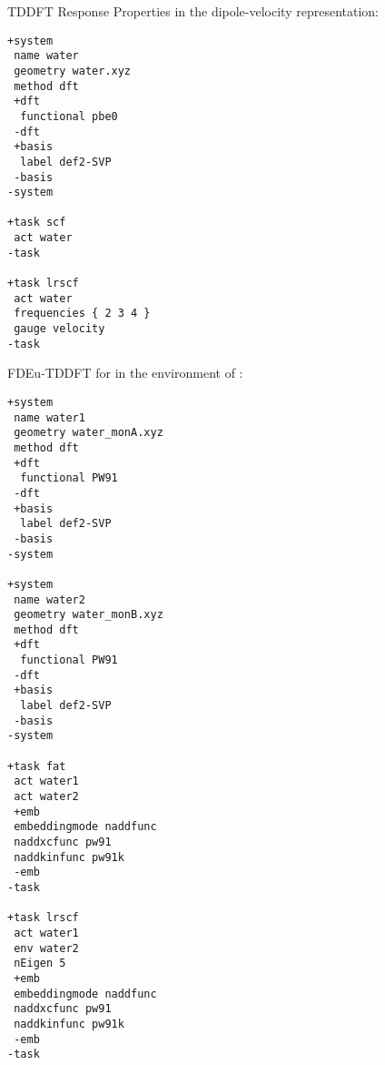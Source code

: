 TDDFT Response Properties in the dipole-velocity representation:
\begin{lstlisting}
+system
 name water
 geometry water.xyz
 method dft
 +dft
  functional pbe0
 -dft
 +basis
  label def2-SVP
 -basis
-system

+task scf
 act water
-task

+task lrscf
 act water
 frequencies { 2 3 4 }
 gauge velocity
-task
\end{lstlisting}
\newpage

FDEu-TDDFT for  in the environment of :
\begin{lstlisting}
+system
 name water1
 geometry water_monA.xyz
 method dft
 +dft
  functional PW91
 -dft
 +basis
  label def2-SVP
 -basis
-system

+system
 name water2
 geometry water_monB.xyz
 method dft
 +dft
  functional PW91
 -dft
 +basis
  label def2-SVP
 -basis
-system

+task fat
 act water1
 act water2
 +emb
 embeddingmode naddfunc
 naddxcfunc pw91
 naddkinfunc pw91k
 -emb
-task

+task lrscf
 act water1
 env water2
 nEigen 5
 +emb
 embeddingmode naddfunc
 naddxcfunc pw91
 naddkinfunc pw91k
 -emb
-task
\end{lstlisting}
\newpage

